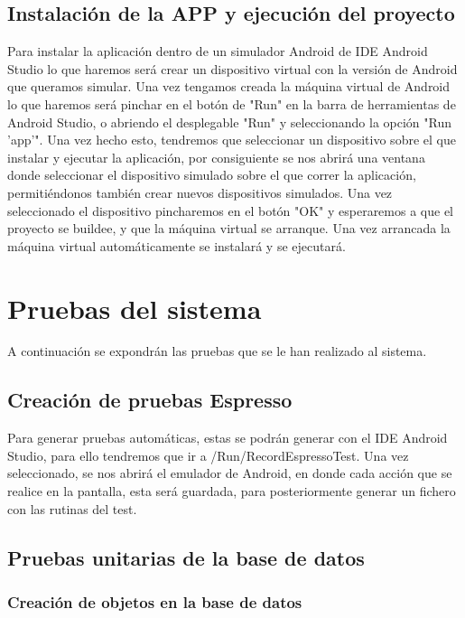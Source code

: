 \subsection{Instalación de la APP y ejecución del proyecto}
Para instalar la aplicación dentro de un simulador Android de IDE Android Studio lo que haremos será crear un dispositivo virtual con la versión de Android que queramos simular. Una vez tengamos creada la máquina virtual de Android lo que haremos será pinchar en el botón de "Run" en la barra de herramientas de Android Studio, o abriendo el desplegable "Run" y seleccionando la opción "Run 'app'". Una vez hecho esto, tendremos que seleccionar un dispositivo sobre el que instalar y ejecutar la aplicación, por consiguiente se nos abrirá una ventana donde seleccionar el dispositivo simulado sobre el que correr la aplicación, permitiéndonos también crear nuevos dispositivos simulados. Una vez seleccionado el dispositivo pincharemos en el botón "OK" y esperaremos a que el proyecto se buildee, y que la máquina virtual se arranque. Una vez arrancada la máquina virtual automáticamente se instalará y se ejecutará.



\section{Pruebas del sistema}
A continuación se expondrán las pruebas que se le han realizado al sistema.

\subsection{Creación de pruebas Espresso}
Para generar pruebas automáticas, estas se podrán generar con el IDE Android Studio, para ello tendremos que ir a /Run/RecordEspressoTest. Una vez seleccionado, se nos abrirá el emulador de Android, en donde cada acción que se realice en la pantalla, esta será guardada, para posteriormente generar un fichero con las rutinas del test.

\subsection{Pruebas unitarias de la base de datos}

\subsubsection{Creación de objetos en la base de datos}

